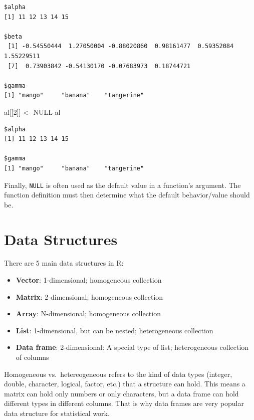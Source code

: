\documentclass[
]{book}
\newenvironment{Shaded}{\begin{snugshade}}{\end{snugshade}}
\newcommand{\ConstantTok}[1]{\textcolor[rgb]{0.00,0.00,0.00}{#1}}
\newcommand{\DecValTok}[1]{\textcolor[rgb]{0.00,0.00,0.81}{#1}}
\newcommand{\NormalTok}[1]{#1}
\newcommand{\OtherTok}[1]{\textcolor[rgb]{0.56,0.35,0.01}{#1}}
\providecommand{\tightlist}{%
  \setlength{\itemsep}{0pt}\setlength{\parskip}{0pt}}
\begin{document}
\begin{verbatim}
$alpha
[1] 11 12 13 14 15

$beta
 [1] -0.54550444  1.27050004 -0.88020860  0.98161477  0.59352084  1.55229511
 [7]  0.73903842 -0.54130170 -0.07683973  0.18744721

$gamma
[1] "mango"     "banana"    "tangerine"
\end{verbatim}

\begin{Shaded}
\begin{Highlighting}[]
\NormalTok{al[[}\DecValTok{2}\NormalTok{]] }\OtherTok{\textless{}{-}} \ConstantTok{NULL}
\NormalTok{al}
\end{Highlighting}
\end{Shaded}

\begin{verbatim}
$alpha
[1] 11 12 13 14 15

$gamma
[1] "mango"     "banana"    "tangerine"
\end{verbatim}

Finally, \texttt{NULL} is often used as the default value in a function's argument. The function definition must then determine what the default behavior/value should be.

\hypertarget{structures}{%
\chapter{Data Structures}\label{structures}}

There are 5 main data structures in R:

\begin{itemize}
\tightlist
\item
  \textbf{Vector}: 1-dimensional; homogeneous collection
\item
  \textbf{Matrix}: 2-dimensional; homogeneous collection
\item
  \textbf{Array}: N-dimensional; homogeneous collection
\item
  \textbf{List}: 1-dimensional, but can be nested; heterogeneous collection
\item
  \textbf{Data frame}: 2-dimensional: A special type of list; heterogeneous collection of columns
\end{itemize}

Homogeneous vs.~hetereogeneous refers to the kind of data types (integer, double, character, logical, factor, etc.) that a structure can hold. This means a matrix can hold only numbers or only characters, but a data frame can hold different types in different columns. That is why data frames are very popular data structure for statistical work.
\end{document}
